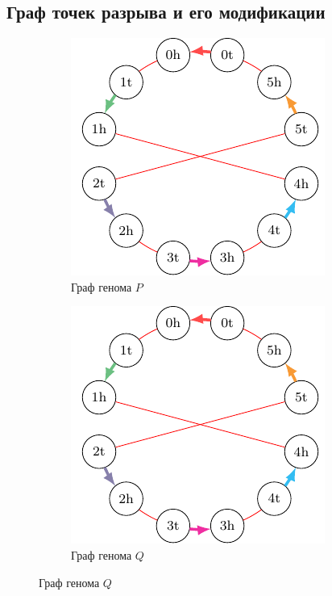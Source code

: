 \subsection{Граф точек разрыва и его модификации}
\label{subsec:breakpoint_graph_formal}

\begin{figure}[h!]
    \centering
    \begin{subfigure}[b]{0.42\textwidth}
        \centering
        \includegraphics[width=\linewidth]{images/part1/genome-graph-q.pdf}
        \caption{Граф генома $P$}
        \label{fig:genome-graph-a}
    \end{subfigure}
    \begin{subfigure}[b]{0.42\textwidth}
        \centering
        \includegraphics[width=\linewidth]{images/part1/genome-graph-q.pdf}
        \caption{Граф генома $Q$}
        \label{fig:genome-graph-b}
    \end{subfigure}
    

\end{figure}
